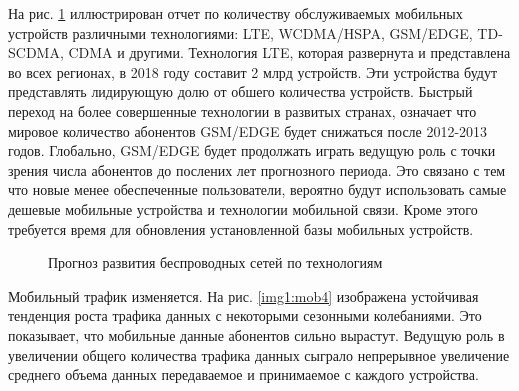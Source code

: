 \clearpage


На рис. \ref{img1:mob3} иллюстрирован отчет по количеству обслуживаемых мобильных устройств различными технологиями: LTE, WCDMA/HSPA, GSM/EDGE, TD-SCDMA, CDMA и другими. Технология LTE, которая развернута и представлена во всех регионах, в 2018 году составит 2 млрд устройств. Эти устройства будут представлять лидирующую долю от обшего количества устройств. Быстрый переход на более совершенные технологии в развитых странах, означает что мировое количество абонентов GSM/EDGE будет снижаться после 2012-2013 годов. Глобально, GSM/EDGE будет продолжать играть ведущую роль с точки зрения числа абонентов до послених лет прогнозного периода. Это связано с тем что новые менее обеспеченные пользователи, вероятно будут использовать самые дешевые мобильные устройства и технологии мобильной связи. Кроме этого требуется время для обновления установленной базы мобильных устройств.


\pgfplotsset{width=15cm, height=10cm, compat=1.3}
\begin{figure} [h]
  \center
{}
\caption{Прогноз развития беспроводных сетей по технологиям \cite{ericsson}}
  \label{img1:mob3}
\end{figure}


Мобильный трафик изменяется. На рис. \ref{img1:mob4} изображена устойчивая тенденция роста трафика данных с некоторыми сезонными колебаниями. Это показывает, что мобильные данные абонентов сильно вырастут. Ведущую роль в увеличении общего количества трафика данных сыграло непрерывное увеличение среднего объема данных передаваемое и принимаемое с каждого устройства.


